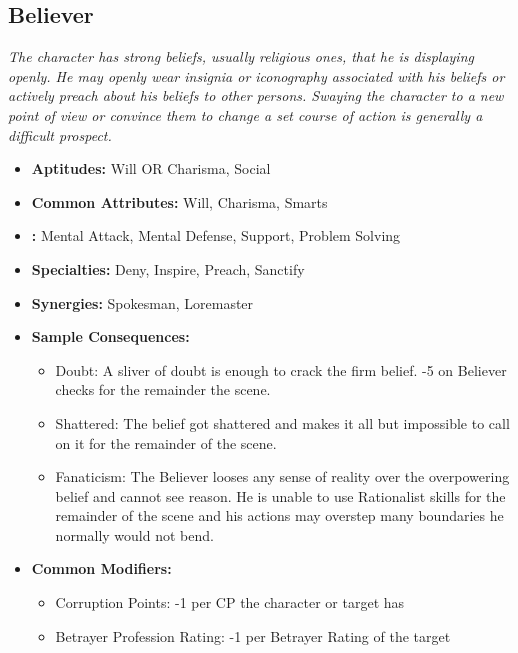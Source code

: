 \subsection{Believer}\label{Believer}
\textit{The character has strong beliefs, usually religious ones, that he is displaying openly.
He may openly wear insignia or iconography associated with his beliefs or actively preach about his beliefs to other persons.
Swaying the character to a new point of view or convince them to change a set course of action is generally a difficult prospect.}
\begin{itemize}
	\item \textbf{Aptitudes:} Will OR Charisma, Social
	\item \textbf{Common Attributes:} Will, Charisma, Smarts
	\item \textbf{:} Mental Attack, Mental Defense, Support, Problem Solving
	\item \textbf{Specialties:} Deny, Inspire, Preach, Sanctify
	\item \textbf{Synergies:} Spokesman, Loremaster
	\item \textbf{Sample Consequences:} 
	\begin{itemize}
		\item Doubt: A sliver of doubt is enough to crack the firm belief. -5 on Believer checks for the remainder the scene.
		\item Shattered: The belief got shattered and makes it all but impossible to call on it for the remainder of the scene.
		\item Fanaticism: The Believer looses any sense of reality over the overpowering belief and cannot see reason. He is unable to use Rationalist skills for the remainder of the scene and his actions may overstep many boundaries he normally would not bend.
	\end{itemize}
	\item \textbf{Common Modifiers:}
	\begin{itemize}
		\item Corruption Points: -1 per CP the character or target has
		\item Betrayer Profession Rating: -1 per Betrayer Rating of the target
	\end{itemize}
\end{itemize}

